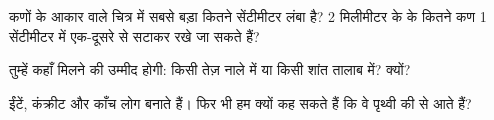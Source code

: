 \begin{exercise}[$\star\star$]\label{exo:g3:stones-pebbles-sand:8}
कणों के आकार वाले चित्र में सबसे बड़ा  कितने सेंटीमीटर लंबा है?
2 मिलीमीटर के  के कितने कण 1 सेंटीमीटर में एक-दूसरे से सटाकर रखे जा
सकते हैं?
\end{exercise}

\begin{exercise}[$\star\star$]\label{exo:g3:stones-pebbles-sand:9}
तुम्हें  कहाँ मिलने की उम्मीद होगी: किसी तेज़  नाले में या किसी
शांत तालाब में? क्यों?
\end{exercise}

\begin{exercise}[$\star\star$]\label{exo:g3:stones-pebbles-sand:10}
ईंटें, कंक्रीट और काँच लोग बनाते हैं। फिर भी हम क्यों कह सकते हैं कि वे
पृथ्वी की  से आते हैं?
\end{exercise}
